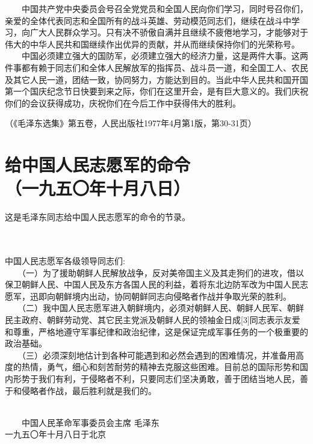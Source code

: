 \documentclass[cn,11pt,chinese]{elegantbook}
\def\myformat#1{\hfil\hfil #1}
\begin{document}
　　中国共产党中央委员会号召全党党员和全国人民向你们学习，同时号召你们，亲爱的全体代表同志和全国所有的战斗英雄、劳动模范同志们，继续在战斗中学习，向广大人民群众学习。只有决不骄傲自满并且继续不疲倦地学习，才能够对于伟大的中华人民共和国继续作出优异的贡献，并从而继续保持你们的光荣称号。\\
　　中国必须建立强大的国防军，必须建立强大的经济力量，这是两件大事。这两件事都有赖于同志们和全体人民解放军的指挥员、战斗员一道，和全国工人、农民及其它人民一道，团结一致，协同努力，方能达到目的。当此中华人民共和国开国第一个国庆纪念节日快要到来之际，你们在这里开会，是有巨大意义的。我们庆祝你们的会议获得成功，庆祝你们在今后工作中获得伟大的胜利。\\
\begin{flushright}（《毛泽东选集》第五卷，人民出版社1977年4月第1版，第30-31页）\end{flushright}
\newpage\section*{\myformat{给中国人民志愿军的命令}\\\myformat{（一九五〇年十月八日）}}
\begin{introduction}\item  这是毛泽东同志给中国人民志愿军的命令的节录。\end{introduction}\\~\\
中国人民志愿军各级领导同志们:\\
　　（一）为了援助朝鲜人民解放战争，反对美帝国主义及其走狗们的进攻，借以保卫朝鲜人民、中国人民及东方各国人民的利益，着将东北边防军改为中国人民志愿军，迅即向朝鲜境内出动，协同朝鲜同志向侵略者作战并争取光荣的胜利。\\
　　（二）我中国人民志愿军进入朝鲜境内，必须对朝鲜人民、朝鲜人民军、朝鲜民主政府、朝鲜劳动党、其它民主党派及朝鲜人民的领袖金日成[3]同志表示友爱和尊重，严格地遵守军事纪律和政治纪律，这是保证完成军事任务的一个极重要的政治基础。\\
　　（三）必须深刻地估计到各种可能遇到和必然会遇到的困难情况，并准备用高度的热情，勇气，细心和刻苦耐劳的精神去克服这些困难。目前总的国际形势和国内形势于我们有利，于侵略者不利，只要同志们坚决勇敢，善于团结当地人民，善于和侵略者作战，最后胜利就是我们的。\\
　　\begin{flushright}
　　中国人民革命军事委员会主席 毛泽东\\一九五〇年十月八日于北京
　　\end{flushright}
\end{document}
